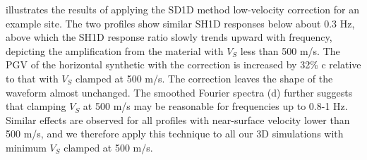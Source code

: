  illustrates the results of applying the SD1D method low-velocity correction for an example site. The two profiles show similar SH1D responses below about 0.3 Hz, above which the SH1D response ratio slowly trends upward with frequency, depicting the amplification from the material with $V_S$ less than 500 m/s. The PGV of the horizontal synthetic with the correction is increased by 32\% c relative to that with $V_S$ clamped at 500 m/s. The correction leaves the shape of the waveform almost unchanged. The smoothed Fourier spectra (d) further suggests that clamping $V_S$ at 500 m/s may be reasonable for frequencies up to 0.8-1 Hz. Similar effects are observed for all profiles with near-surface velocity lower than 500 m/s, and we therefore apply this technique to all our 3D simulations with minimum $V_S$ clamped at 500 m/s.




